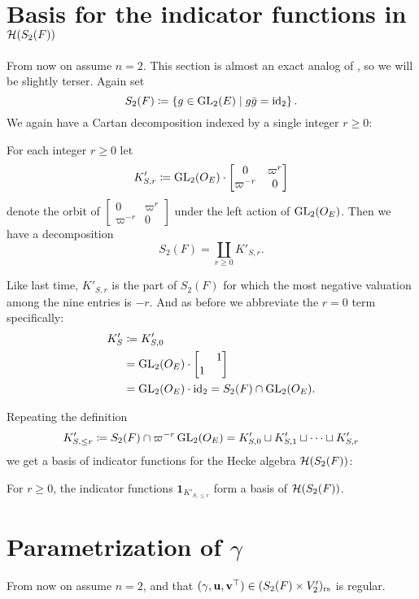 \section{Basis for the indicator functions in $\mathcal H(S_2(F))$}
From now on assume $n = 2$.
This section is almost an exact analog of ,
so we will be slightly terser.
Again set
\[ S_2(F) \coloneqq \left\{ g \in \operatorname{GL}_2(E) \mid g \bar{g} = \operatorname{id}_2 \right\}. \]
We again have a Cartan decomposition indexed by a single integer $r \ge 0$:
\begin{lemma}
  For each integer $r \ge 0$ let
  \[ K'_{S,r} \coloneqq \operatorname{GL}_2(O_E) \cdot
    \begin{bmatrix} 0 & \varpi^r \\ \varpi^{-r} & 0 \end{bmatrix} \]
  denote the orbit of
  $\begin{bmatrix} 0 & \varpi^r \\ \varpi^{-r} & 0 \end{bmatrix}$
  under the left action of $\operatorname{GL}_2(O_E)$.
  Then we have a decomposition
  \[ S_2(F) = \coprod_{r \geq 0} K'_{S,r}. \]
\end{lemma}
Like last time, $K'_{S,r}$ is the part of $S_2(F)$
for which the most negative valuation among the nine entries is $-r$.
And as before we abbreviate the $r = 0$ term specifically:
\begin{align*}
  K'_S
  &\coloneqq K'_{S,0} \\
  &= \operatorname{GL}_2(O_E) \cdot \begin{bmatrix} & 1 \\ 1 \end{bmatrix} \\
  &= \operatorname{GL}_2(O_E) \cdot \operatorname{id}_2 = S_2(F) \cap \operatorname{GL}_2(O_E).
\end{align*}

Repeating the definition
\[ K'_{S, \le r} \coloneqq S_2(F) \cap \varpi^{-r} \operatorname{GL}_2(O_E)
  = K'_{S,0} \sqcup K'_{S,1} \sqcup \dots \sqcup K'_{S,r} \]
we get a basis of indicator functions for the Hecke algebra $\mathcal H(S_2(F))$:
\begin{proposition}
  For $r \ge 0$, the indicator functions $\mathbf{1}_{K'_{S, \le r}}$
  form a basis of $\mathcal H(S_2(F))$.
\end{proposition}

\section{Parametrization of $\gamma$}
From now on assume $n = 2$,
and that $(\gamma, \mathbf u, \mathbf v^\top) \in (S_2(F) \times V'_2)_{\mathrm{rs}}$ is regular.

